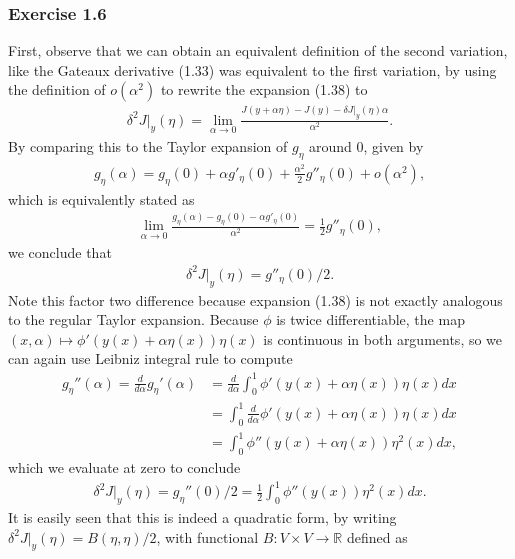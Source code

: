 \documentclass[a4paper]{article}
\begin{document}
\subsubsection*{Exercise 1.6}

First, observe that we can obtain an equivalent definition of the second
variation, like the Gateaux derivative (1.33) was equivalent to the first
variation, by using the definition of $o(\alpha^{2})$ to rewrite the expansion
(1.38) to
\begin{align*}
  \delta^{2}J |_{y}(\eta) = \lim_{\alpha \rightarrow 0} \frac{J(y + \alpha \eta) - J(y) - \delta J |_{y}(\eta) \alpha}{\alpha^{2}} .
\end{align*}
By comparing this to the Taylor expansion of $g_{\eta}$ around $0$, given by
\begin{align*}
  g_{\eta}(\alpha) = g_{\eta}(0) + \alpha g'_{\eta}(0) + \frac{\alpha^{2}}{2} g''_{\eta}(0) + o(\alpha^{2}) ,
\end{align*}
which is equivalently stated as
\begin{align*}
  \lim_{\alpha \rightarrow 0} \frac{g_{\eta}(\alpha) - g_{\eta}(0) - \alpha g'_{\eta}(0)}{\alpha^{2}} = \frac{1}{2} g''_{\eta}(0) ,
\end{align*}
we conclude that
\begin{align*}
  \delta^{2} J |_{y}(\eta) = g''_{\eta}(0) / 2 .
\end{align*}
Note this factor two difference because expansion (1.38) is not exactly analogous to the regular Taylor expansion.
%
Because $\phi$ is twice differentiable, the map
$(x, \alpha) \mapsto \phi'(y(x) + \alpha \eta(x)) \eta(x)$ is continuous in both
arguments, so we can again use Leibniz integral rule to compute
\begin{align*}
  g_{\eta}''(\alpha) = \frac{d}{d\alpha} g_{\eta}'(\alpha) &= \frac{d}{d\alpha} \int_{0}^{1} \phi'(y(x) + \alpha\eta(x))\eta(x) dx \\
  &= \int_{0}^{1} \frac{d}{d\alpha} \phi'(y(x) + \alpha \eta(x))\eta(x) dx \\
  &= \int_{0}^{1} \phi''(y(x) + \alpha \eta(x))\eta^{2}(x) dx ,
\end{align*}
which we evaluate at zero to conclude
\begin{align*}
  \delta^{2}J |_{y}(\eta) = g_{\eta}''(0) / 2 = \frac{1}{2} \int_{0}^{1} \phi''(y(x))\eta^{2}(x) dx .
\end{align*}
%
It is easily seen that this is indeed a quadratic form, by writing $\delta^{2}J |_{y}(\eta) = B(\eta, \eta) / 2$, with functional $B: V \times V \rightarrow \mathbb{R}$ defined as
\end{document}
